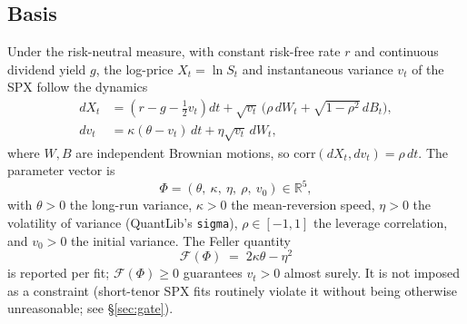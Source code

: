 \documentclass[a4paper, 11pt, reqno]{amsart}
\newcommand{\Real}{\mathbb{R}}
\begin{document}
		\subsection{Basis}
			Under the risk-neutral measure, with constant risk-free rate $r$ and continuous
			dividend yield $g$, the log-price $X_t=\ln S_t$ and instantaneous variance $v_t$ of the
			SPX follow the \textcite{heston1993} dynamics
			\begin{align}
				dX_t &= \left( r - g - \tfrac{1}{2} v_t \right) dt
					+ \sqrt{v_t}\,\bigl( \rho\, dW_t + \sqrt{1 - \rho^2}\, dB_t \bigr), \label{eq:level} \\
				dv_t &= \kappa(\theta - v_t)\, dt + \eta \sqrt{v_t}\, dW_t, \label{eq:variance}
			\end{align}
			where $W,B$ are independent Brownian motions, so $\mathrm{corr}(dX_t,dv_t)=\rho\,dt$.
			The parameter vector is
			\begin{equation}\label{eq:heston-params}
				\Phi = (\theta,\ \kappa,\ \eta,\ \rho,\ v_0) \in \Real^5,
			\end{equation}
			with $\theta>0$ the long-run variance, $\kappa>0$ the mean-reversion speed, $\eta>0$ the
			volatility of variance (QuantLib's \texttt{sigma}), $\rho\in[-1,1]$ the leverage
			correlation, and $v_0>0$ the initial variance. The Feller quantity \parencite{feller1951}
			\begin{equation}\label{eq:feller}
				\mathcal{F}(\Phi) \;=\; 2\kappa\theta - \eta^2
			\end{equation}
			is reported per fit; $\mathcal{F}(\Phi)\ge 0$ guarantees $v_t>0$ almost surely. It is not
			imposed as a constraint (short-tenor SPX fits routinely violate it without being
			otherwise unreasonable; see \S\ref{sec:gate}).
			
\end{document}
